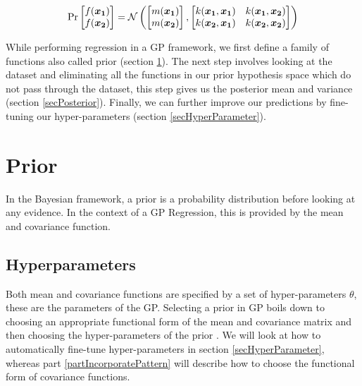 \begin{equation}\label{equationGPMarginalizationProperty}
\Pr\left [ \begin{matrix}
f(\boldsymbol{x_1})
\\ f(\boldsymbol{x_2})
\end{matrix} \right ] = \mathcal{N}\left (\left [ \begin{matrix}
m(\boldsymbol{x_1})
\\ m(\boldsymbol{x_2})

\end{matrix} \right ] , \left [ \begin{matrix}
k(\boldsymbol{x_1}, \boldsymbol{x_1}) & k(\boldsymbol{x_1}, \boldsymbol{x_2})\\ 
k(\boldsymbol{x_2}, \boldsymbol{x_1}) & k(\boldsymbol{x_2}, \boldsymbol{x_2})
\end{matrix} \right ] \right )
\end{equation}

While performing regression in a GP framework, we first define a family of functions also called prior (section \ref{secPrior}). The next step involves looking at the dataset and eliminating all the functions in our prior hypothesis space which do not pass through the dataset, this step gives us the posterior mean and variance (section \ref{secPosterior}). Finally, we can further improve our predictions by fine-tuning our hyper-parameters (section \ref{secHyperParameter}).

\section{Prior} \label{secPrior}
In the Bayesian framework, a prior is a probability distribution before looking at any evidence. In the context of a GP Regression, this is provided by the mean and covariance function. 

\subsection{Hyperparameters}
Both mean and covariance functions are specified by a set of hyper-parameters $\theta$, these are the parameters of the GP. Selecting a prior in GP boils down to choosing an appropriate functional form of the mean and covariance matrix and then choosing the hyper-parameters of the prior \cite{rasmussen2006gaussian}. We will look at how to automatically fine-tune hyper-parameters in section \ref{secHyperParameter}, whereas part \ref{partIncorporatePattern} will describe how to choose the functional form of covariance functions.

